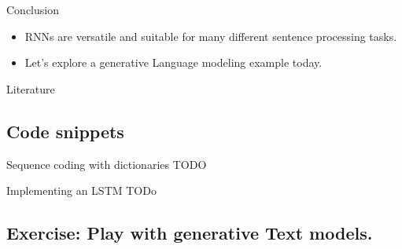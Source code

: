 \documentclass{beamer}
\begin{document}

    \begin{frame}{Conclusion}
      \begin{itemize}
        \item RNNs are versatile and suitable for many different sentence processing tasks.
        \item Let's explore a generative Language modeling example today.
      \end{itemize}
    \end{frame}

    \begin{frame}[allowframebreaks]{Literature}
      \printbibliography
    \end{frame}

    \subsection{Code snippets}
    \begin{frame}{Sequence coding with dictionaries}
      TODO
    \end{frame}

    \begin{frame}{Implementing an LSTM}
      TODo
    \end{frame}


    \subsection{Exercise: Play with generative Text models.}
\end{document}
